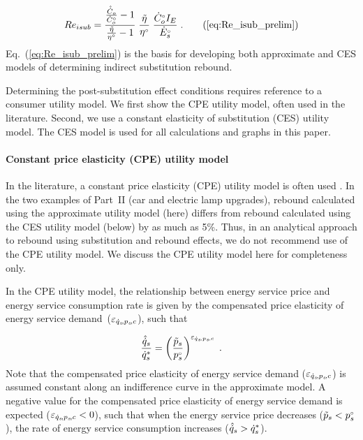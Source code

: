 \begin{equation}
  Re_{isub} = \frac{\frac{\rasub{C}_o}{\rorig{C}_o} - 1}{\etaratiostacked - 1} \; 
                          \etaratiostacked \; 
                          \frac{\rbempl{C}_o I_E}{\rbempl{E}_s} \; .
                              \tag{\ref{eq:Re_isub_prelim}}
\end{equation}
%
Eq.~(\ref{eq:Re_isub_prelim}) is the basis for
developing both approximate and CES models of determining
indirect substitution rebound.

Determining the post-substitution effect conditions
requires reference to a consumer utility model.
We first show the CPE utility model, often used in the literature. 
Second, we use a constant elasticity of substitution (CES)
utility model. 
The CES model is used for all calculations and graphs in this paper.


\paragraph{Constant price elasticity (CPE) utility model} 
\label{sec:Resub_approximate_method}

In the literature, a constant price elasticity (CPE) utility model
is often used 
\citep[p.~17, footnote~43]{Borenstein:2015aa}.
In the two examples of Part~II (car and electric lamp upgrades),
rebound calculated using the approximate utility model (here)
differs from rebound calculated using the CES utility model (below) 
by as much as 5\%.
Thus, in an analytical approach to rebound
using substitution and rebound effects,
we do not recommend use of the CPE utility model.
We discuss the CPE utility model here for completeness only.

In the CPE utility model, 
the relationship between energy service price and energy service consumption rate
is given by the compensated price elasticity of energy service demand~($\varepsilon_{\dot{q}_s\!,p_s\!,c}$),
such that

\begin{equation}
  \frac{\hat{\dot{q}}_s}{{\dot{q}}^*_s} = \left( \frac{\tilde{p}_s}{{}{p}^{\scriptscriptstyle \circ}_s} \right)^{\varepsilon_{\dot{q}_s\!,p_s\!,c}} \; .
\end{equation}
%
Note that the compensated price elasticity of energy service demand ($\varepsilon_{\dot{q}_s\!,p_s\!,c}$)
is assumed constant along an indifference curve
in the approximate model. 
A negative value for the compensated price elasticity of energy service demand
is expected ($\varepsilon_{\dot{q}_s\!,p_s\!,c} < 0$),
such that when the energy service price decreases ($\tilde{p}_s < {}{p}^{\scriptscriptstyle \circ}_s$),
the rate of energy service consumption increases ($\hat{\dot{q}}_s > {\dot{q}}^*_s$).

